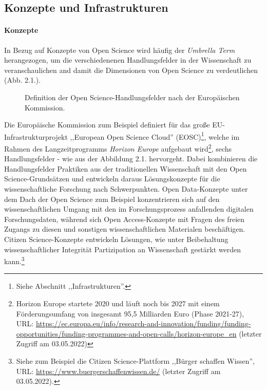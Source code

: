 \subsection{Konzepte und Infrastrukturen} 

\paragraph{Konzepte}

In Bezug auf Konzepte von Open Science wird häufig der \textit{Umbrella Term} herangezogen, um die verschiedenenen Handlungsfelder in der Wissenschaft zu veranschaulichen and damit die Dimensionen von Open Science zu verdeutlichen (Abb. 2.1.). 

\begin{figure}[h]
    \centering
    \caption{Definition der Open Science-Handlungsfelder nach der Europäischen Kommission.\protect\footnotemark}
    \label{fig:x cubed graph}
\end{figure} 

Die Europäische Kommission zum Beispiel definiert für das große EU-Infrastrukturprojekt ,,European Open Science Cloud'' (EOSC)\footnote{Siehe Abschnitt ,,Infrastrukturen''.}, welche im Rahmen des Langzeitprogramms \textit{Horizon Europe} aufgebaut wird\footnote{Horizon Europe startete 2020 und läuft noch bis 2027 mit einem Förderungsumfang von insgesamt 95,5 Milliarden Euro (Phase 2021-27), URL: \url{https://ec.europa.eu/info/research-and-innovation/funding/funding-opportunities/funding-programmes-and-open-calls/horizon-europe_en} (letzter Zugriff am 03.05.2022)}, sechs Handlungsfelder - wie aus der Abbildung 2.1. hervorgeht. Dabei kombinieren die Handlungsfelder Praktiken aus der traditionellen Wissenschaft mit den Open Science-Grundsätzen und entwickeln daraus Lösungskonzepte für die wissenschaftliche Forschung nach Schwerpunkten. Open Data-Konzepte unter dem Dach der Open Science zum Beispiel konzentrieren sich auf den wissenschaftlichen Umgang mit den im Forschungsprozess anfallenden digitalen Forschungsdaten, während sich Open Access-Konzepte mit Fragen des freien Zugangs zu diesen und sonstigen wissenschaftlichen Materialen beschäftigen. Citizen Science-Konzepte entwickeln Lösungen, wie unter Beibehaltung wissenschaftlicher Integrität Partizipation an Wissenschaft gestärkt werden kann.\footnote{Siehe zum Beispiel die Citizen Science-Plattform ,,Bürger schaffen Wissen'', URL: \url{https://www.buergerschaffenwissen.de/} (letzter Zugriff am 03.05.2022).}

